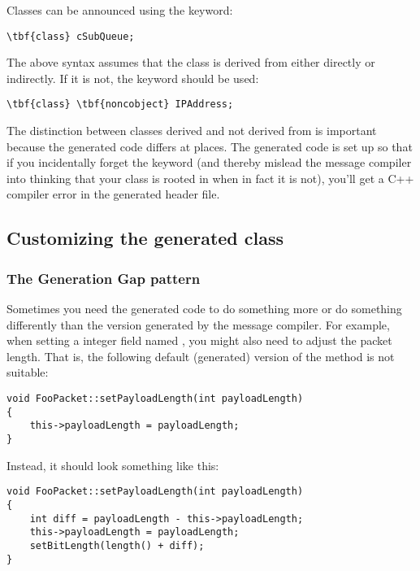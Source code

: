 Classes can be announced using the  keyword:

\begin{Verbatim}[commandchars=\\\{\}]
\tbf{class} cSubQueue;
\end{Verbatim}

The above syntax assumes that the class is derived from 
either directly or indirectly. If it is not, the 
keyword should be used:

\begin{Verbatim}[commandchars=\\\{\}]
\tbf{class} \tbf{noncobject} IPAddress;
\end{Verbatim}

The distinction between classes derived and not derived from 
is important because the generated code differs at places.
The generated code is set up so that if you incidentally
forget the  keyword (and thereby mislead the
message compiler into thinking that your class is rooted in
 when in fact it is not), you'll get a C++ compiler
error in the generated header file.


\subsection{Customizing the generated class}
\label{sec:ch-messages:customizing-generated-class}


\subsubsection{The Generation Gap pattern}

Sometimes you need the generated code to do something
more or do something differently than the version generated
by the message compiler.
For example, when setting a integer field named ,
you might also need to adjust the packet length. That is,
the following default (generated) version of the
 method is not suitable:

\begin{verbatim}
void FooPacket::setPayloadLength(int payloadLength)
{
    this->payloadLength = payloadLength;
}
\end{verbatim}

Instead, it should look something like this:

\begin{verbatim}
void FooPacket::setPayloadLength(int payloadLength)
{
    int diff = payloadLength - this->payloadLength;
    this->payloadLength = payloadLength;
    setBitLength(length() + diff);
}
\end{verbatim}

